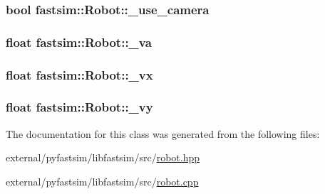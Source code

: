 \subsubsection[{\texorpdfstring{\+\_\+use\+\_\+camera}{_use_camera}}]{\setlength{\rightskip}{0pt plus 5cm}bool fastsim\+::\+Robot\+::\+\_\+use\+\_\+camera\hspace{0.3cm}{\ttfamily [protected]}}\hypertarget{classfastsim_1_1_robot_a8c55febf6b863bd27258800d97ffb1ae}{}\label{classfastsim_1_1_robot_a8c55febf6b863bd27258800d97ffb1ae}
\subsubsection[{\texorpdfstring{\+\_\+va}{_va}}]{\setlength{\rightskip}{0pt plus 5cm}float fastsim\+::\+Robot\+::\+\_\+va\hspace{0.3cm}{\ttfamily [protected]}}\hypertarget{classfastsim_1_1_robot_abc9af3f2d17c288870d474e7a57dd953}{}\label{classfastsim_1_1_robot_abc9af3f2d17c288870d474e7a57dd953}
\subsubsection[{\texorpdfstring{\+\_\+vx}{_vx}}]{\setlength{\rightskip}{0pt plus 5cm}float fastsim\+::\+Robot\+::\+\_\+vx\hspace{0.3cm}{\ttfamily [protected]}}\hypertarget{classfastsim_1_1_robot_a91147570b2cf4518fdcffa9f80becd46}{}\label{classfastsim_1_1_robot_a91147570b2cf4518fdcffa9f80becd46}
\subsubsection[{\texorpdfstring{\+\_\+vy}{_vy}}]{\setlength{\rightskip}{0pt plus 5cm}float fastsim\+::\+Robot\+::\+\_\+vy\hspace{0.3cm}{\ttfamily [protected]}}\hypertarget{classfastsim_1_1_robot_acd1281de279846f404508c409156b81d}{}\label{classfastsim_1_1_robot_acd1281de279846f404508c409156b81d}


The documentation for this class was generated from the following files\+:\begin{DoxyCompactItemize}
\item 
external/pyfastsim/libfastsim/src/\hyperlink{robot_8hpp}{robot.\+hpp}\item 
external/pyfastsim/libfastsim/src/\hyperlink{robot_8cpp}{robot.\+cpp}\end{DoxyCompactItemize}
